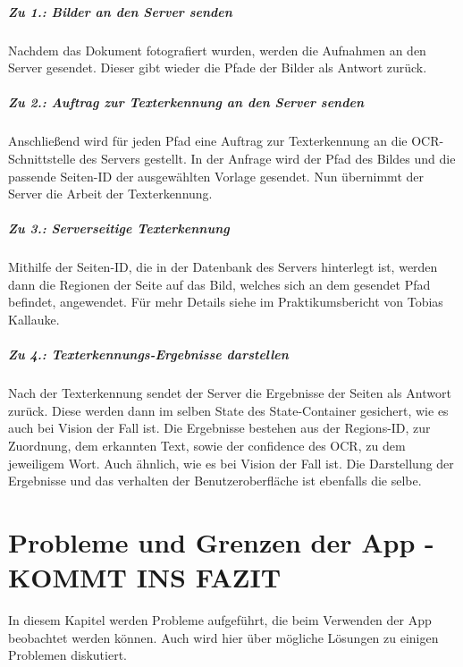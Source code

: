 \documentclass[nomenclature, oneside, 150]{HSMW-Thesis}
\begin{document}
				\paragraph{Zu 1.: Bilder an den Server senden}
				Nachdem das Dokument fotografiert wurden, werden die Aufnahmen an den Server gesendet. Dieser gibt wieder die Pfade der Bilder als Antwort zurück. 
				
				\paragraph{Zu 2.: Auftrag zur Texterkennung an den Server senden}
				Anschließend wird für jeden Pfad eine Auftrag zur Texterkennung an  die OCR-Schnittstelle des Servers gestellt. In der Anfrage wird der Pfad des Bildes und die passende Seiten-ID der ausgewählten Vorlage gesendet. Nun übernimmt der Server die Arbeit der Texterkennung. 
				
				\paragraph{Zu 3.: Serverseitige Texterkennung}
				Mithilfe der Seiten-ID, die in der Datenbank des Servers hinterlegt ist, werden dann die Regionen der Seite auf das Bild, welches sich an dem gesendet Pfad befindet, angewendet. Für mehr Details siehe im Praktikumsbericht von Tobias Kallauke. 
				
				\paragraph{Zu 4.: Texterkennungs-Ergebnisse darstellen}
				Nach der Texterkennung sendet der Server die Ergebnisse der Seiten als Antwort zurück. Diese werden dann im selben State des State-Container gesichert, wie es auch bei Vision der Fall ist. Die Ergebnisse bestehen aus der Regions-ID, zur Zuordnung, dem erkannten Text, sowie der confidence des OCR, zu dem jeweiligem Wort. Auch ähnlich, wie es bei Vision der Fall ist. Die Darstellung der Ergebnisse und das verhalten der Benutzeroberfläche ist ebenfalls die selbe.
		

\chapter{Probleme und Grenzen der App - KOMMT INS FAZIT}\label{ch:grenzen}
	In diesem Kapitel werden Probleme aufgeführt, die beim Verwenden der App beobachtet werden können. Auch wird hier über mögliche Lösungen zu einigen Problemen diskutiert.
\end{document}
